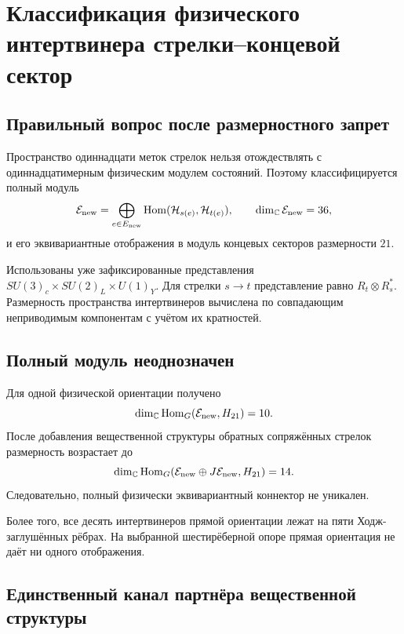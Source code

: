 \chapter{Классификация физического интертвинера стрелки--концевой сектор}
\label{ch:v8-physical-arrow-endpoint-intertwiner-classification-gate}

\section{Правильный вопрос после размерностного запрет}

Пространство одиннадцати меток стрелок нельзя отождествлять с
одиннадцатимерным физическим модулем состояний. Поэтому классифицируется полный
модуль
\begin{equation}
 \mathcal E_{\rm new}=\bigoplus_{e\in E_{\rm new}}
 \operatorname{Hom}(\mathcal H_{s(e)},\mathcal H_{t(e)}),
 \qquad \dim_{\mathbb C}\mathcal E_{\rm new}=36,
\end{equation}
и его эквивариантные отображения в модуль концевых секторов размерности $21$.

Использованы уже зафиксированные представления
$SU(3)_c\times SU(2)_L\times U(1)_Y$. Для стрелки $s\to t$ представление
равно $R_t\otimes R_s^*$. Размерность пространства интертвинеров вычислена
по совпадающим неприводимым компонентам с учётом их кратностей.

\section{Полный модуль неоднозначен}

Для одной физической ориентации получено
\begin{equation}
 \dim_{\mathbb C}\operatorname{Hom}_G(\mathcal E_{\rm new},H_{21})=10.
\end{equation}
После добавления вещественной структуры обратных сопряжённых стрелок размерность возрастает до
\begin{equation}
 \dim_{\mathbb C}\operatorname{Hom}_G(
 \mathcal E_{\rm new}\oplus J\mathcal E_{\rm new},H_{21})=14.
\end{equation}
Следовательно, полный физически эквивариантный коннектор не уникален.

Более того, все десять интертвинеров прямой ориентации лежат на пяти
Ходж-заглушённых рёбрах. На выбранной шестирёберной опоре прямая
ориентация не даёт ни одного отображения.

\section{Единственный канал партнёра вещественной структуры}

